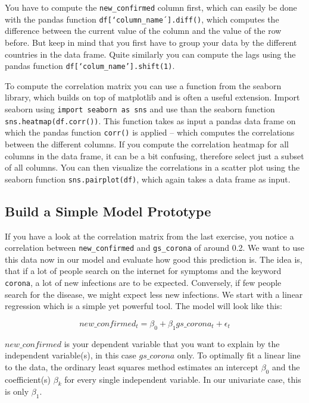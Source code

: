 \documentclass[
  11pt,
]{article}
\newenvironment{tipsp}[1]
  {
  \begin{itemize}
  \footnotesize
  \renewcommand{\labelitemi}{
    \raisebox{-.7\height}[0pt][0pt]{
      {\setkeys{Gin}{width=3em,keepaspectratio}
        \texttt{[image: images/\#1.png]}}
    }
  }
  \setlength{\fboxsep}{1em}
  \begin{pbox}
  \item
  }
  {
  \end{pbox}
  \end{itemize}
  }
\begin{document}
\begin{tipsp}p

You have to compute the \texttt{new\_confirmed} column first, which can easily be done with the pandas function \texttt{df{[}‘column\_name´{]}.diff()}, which computes the difference between the current value of the column and the value of the row before. But keep in mind that you first have to group your data by the different countries in the data frame.
Quite similarly you can compute the lags using the pandas function \texttt{df{[}‘colum\_name’{]}.shift(1)}.

To compute the correlation matrix you can use a function from the seaborn library, which builds on top of matplotlib and is often a useful extension.
Import seaborn using \texttt{import\ seaborn\ as\ sns} and use than the seaborn function \texttt{sns.heatmap(df.corr())}. This function takes as input a pandas data frame on which the pandas function \texttt{corr()} is applied -- which computes the correlations between the different columns. If you compute the correlation heatmap for all columns in the data frame, it can be a bit confusing, therefore select just a subset of all columns.
You can then visualize the correlations in a scatter plot using the seaborn function \texttt{sns.pairplot(df)}, which again takes a data frame as input.

\end{tipsp}

\hypertarget{build-a-simple-model-prototype}{%
\subsection{Build a Simple Model Prototype}\label{build-a-simple-model-prototype}}

If you have a look at the correlation matrix from the last exercise, you notice a correlation between \texttt{new\_confirmed} and \texttt{gs\_corona} of around 0.2. We want to use this data now in our model and evaluate how good this prediction is.
The idea is, that if a lot of people search on the internet for symptoms and the keyword \texttt{corona}, a lot of new infections are to be expected. Conversely, if few people search for the disease, we might expect less new infections. We start with a linear regression which is a simple yet powerful tool. The model will look like this:

\[ new\_confirmed_t = \beta_0 + \beta_1 gs\_corona_t +\epsilon_t \]

\(new\_confirmed\) is your dependent variable that you want to explain by the independent variable(s), in this case \(gs\_corona\) only. To optimally fit a linear line to the data, the ordinary least squares method estimates an intercept \(\beta_0\) and the coefficient(s) \(\beta_k\) for every single independent variable. In our univariate case, this is only \(\beta_1\).
\end{document}
